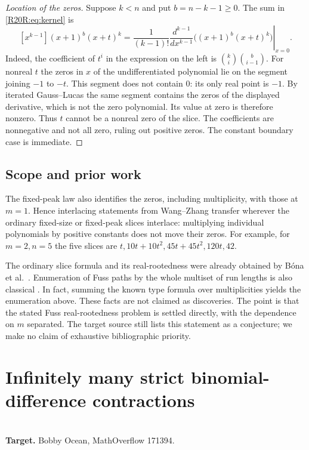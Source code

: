\documentclass[11pt,a4paper]{article}
\begin{document}
\begin{proof}[Location of the zeros]
Suppose $k<n$ and put $b=n-k-1\ge0$. The sum in
\eqref{R20R:eq:kernel} is
\[
 [x^{k-1}](x+1)^b(x+t)^k
 =\frac{1}{(k-1)!}
 \left.\frac{d^{k-1}}{dx^{k-1}}\big((x+1)^b(x+t)^k\big)\right|_{x=0}.
\]
Indeed, the coefficient of $t^i$ in the expression on the left is
$\binom{k}{i}\binom{b}{i-1}$. For nonreal $t$ the zeros in $x$ of
the undifferentiated polynomial lie on the segment joining $-1$ to
$-t$. This segment does not contain $0$: its only real point is
$-1$. By iterated Gauss--Lucas the same segment contains the zeros of
the displayed derivative, which is not the zero polynomial.
Its value at zero is therefore nonzero. Thus $t$ cannot be a
nonreal zero of the slice. The coefficients are nonnegative and not all
zero, ruling out positive zeros. The constant boundary case is immediate.
\end{proof}

\subsection{Scope and prior work}
The fixed-peak law also identifies the zeros, including multiplicity,
with those at $m=1$. Hence interlacing statements from
Wang--Zhang \cite{R20R:WZ} transfer wherever the ordinary fixed-size or
fixed-peak slices interlace: multiplying individual polynomials by
positive constants does not move their zeros. For example, for
$m=2,n=5$ the five slices are $t,10t+10t^2,45t+45t^2,120t,42$.

The ordinary slice formula and its real-rootedness were already obtained
by B\'ona et al.\ \cite{R20R:B}. Enumeration of Fuss paths by the
whole multiset of run lengths is also classical \cite{R20R:Arm}.
In fact, summing the known type formula over multiplicities yields the
enumeration above. These facts are not claimed as discoveries. The
point is that the stated Fuss real-rootedness problem is settled
directly, with the dependence on $m$ separated. The target source still
lists this statement as a conjecture; we make no claim of exhaustive
bibliographic priority.
\endgroup


\clearpage

\section{Infinitely many strict binomial-difference contractions}
\label{section:R20S}
\\[3pt]
\noindent\textbf{Target.} Bobby Ocean, MathOverflow 171394.
\end{document}
